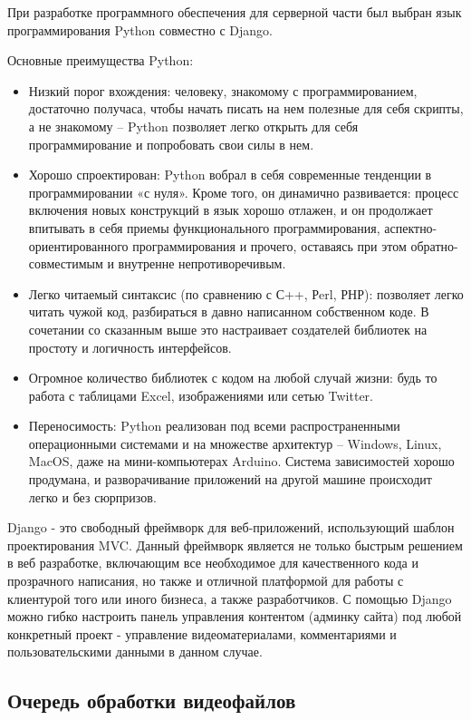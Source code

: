 При разработке программного обеспечения для серверной части был выбран
язык программирования Python совместно с Django.

Основные преимущества Python:
\begin{itemize}[wide,topsep=0pt]
  \itemsep0em
  \item Низкий порог вхождения: человеку, знакомому с программированием, достаточно получаса, чтобы начать писать на нем полезные для себя скрипты, а не знакомому – Python позволяет легко открыть для себя программирование и попробовать свои силы в нем.
  \item Хорошо спроектирован: Python вобрал в себя современные тенденции в программировании «с нуля». Кроме того, он динамично развивается: процесс включения новых конструкций в язык хорошо отлажен, и он продолжает впитывать в себя приемы функционального программирования, аспектно-ориентированного программирования и прочего, оставаясь при этом обратно-совместимым и внутренне непротиворечивым.
  \item Легко читаемый синтаксис (по сравнению с С++, Рerl, РНР): позволяет легко читать чужой код, разбираться в давно написанном собственном коде. В сочетании со сказанным выше это настраивает создателей библиотек на простоту и логичность интерфейсов.
  \item Огромное количество библиотек с кодом на любой случай жизни: будь то работа с таблицами Excel, изображениями или сетью Twitter.
  \item Переносимость: Python реализован под всеми распространенными операционными системами и на множестве архитектур – Windows, Linux, MacOS, даже на мини-компьютерах Arduino. Система зависимостей хорошо продумана, и разворачивание приложений на другой машине происходит легко и без сюрпризов.
\end{itemize}

Django - это свободный фреймворк для веб-приложений, использующий шаблон проектирования MVC.
Данный фреймворк является не только быстрым решением в веб разработке,
включающим все необходимое для качественного кода и прозрачного написания,
но также и отличной платформой для работы с клиентурой того или иного бизнеса,
а также разработчиков. С помощью Django можно гибко настроить панель управления контентом
(админку сайта) под любой конкретный проект - управление видеоматериалами,
комментариями и пользовательскими данными в данном случае.



\subsection{Очередь обработки видеофайлов}

